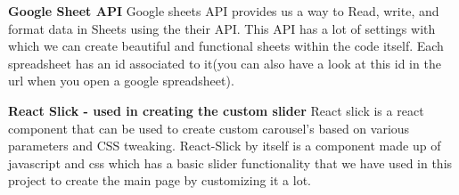 \textbf{Google Sheet API}
Google sheets API provides us a way to Read, write, and format data in Sheets using the their API. This API has a lot of settings with which we can create beautiful and functional sheets within the code itself. Each spreadsheet has an id associated to it(you can also have a look at this id in the url when you open a google spreadsheet).

\textbf{React Slick - used in creating the custom slider}
React slick is a react component that can be used to create custom carousel's based on various parameters and CSS tweaking. React-Slick by itself is a component made up of javascript and css which has a basic slider functionality that we have used in this project to create the main page by customizing it a lot.




